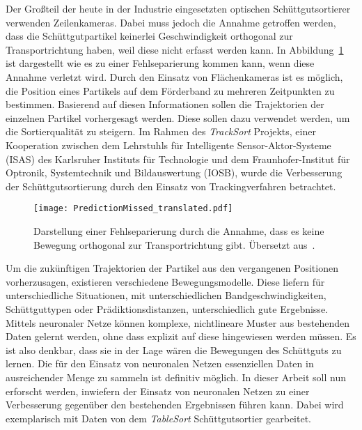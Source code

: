 
Der Großteil der heute in der Industrie eingesetzten optischen Schüttgutsortierer verwenden Zeilenkameras.
Dabei muss jedoch die Annahme getroffen werden, dass die Schüttgutpartikel keinerlei Geschwindigkeit orthogonal zur Transportrichtung haben,
weil diese nicht erfasst werden kann.
In Abbildung~\ref{fig:predMissed} ist dargestellt wie es zu einer Fehlseparierung kommen kann, wenn diese Annahme verletzt wird.
Durch den Einsatz von Flächenkameras ist es möglich, die Position eines Partikels auf dem Förderband zu mehreren Zeitpunkten zu bestimmen.
Basierend auf diesen Informationen sollen die Trajektorien der einzelnen Partikel vorhergesagt werden.
Diese sollen dazu verwendet werden, um die Sortierqualität zu steigern. 
Im Rahmen des \textit{TrackSort} Projekts, 
einer Kooperation zwischen dem Lehrstuhls für Intelligente Sensor-Aktor-Systeme (ISAS) des Karlsruher Instituts für Technologie
und dem Fraunhofer-Institut für Optronik, Systemtechnik und Bildauswertung (IOSB), 
wurde die Verbesserung der Schüttgutsortierung durch den Einsatz von Trackingverfahren betrachtet.

\begin{figure}[h]
    \centering
    \texttt{[image: PredictionMissed\_translated.pdf]}
    \caption{Darstellung einer Fehlseparierung durch die Annahme, dass es keine Bewegung orthogonal zur Transportrichtung gibt. 
    Übersetzt aus~\cite{Pfaff2018}.}
    \label{fig:predMissed}
\end{figure}


Um die zukünftigen Trajektorien der Partikel aus den vergangenen Positionen vorherzusagen, existieren verschiedene Bewegungsmodelle.
Diese liefern für unterschiedliche Situationen, mit unterschiedlichen Bandgeschwindigkeiten, Schüttguttypen oder Prädiktionsdistanzen, unterschiedlich gute Ergebnisse.  
Mittels neuronaler Netze können komplexe, nichtlineare Muster aus bestehenden Daten gelernt werden, ohne dass explizit auf diese hingewiesen werden müssen.
Es ist also denkbar, dass sie in der Lage wären die Bewegungen des Schüttguts zu lernen.
Die für den Einsatz von neuronalen Netzen essenziellen Daten in ausreichender Menge zu sammeln ist definitiv möglich. 
In dieser Arbeit soll nun erforscht werden, inwiefern der Einsatz von neuronalen Netzen zu einer Verbesserung gegenüber den bestehenden Ergebnissen führen kann.
Dabei wird exemplarisch mit Daten von dem \textit{TableSort} Schüttgutsortier gearbeitet.

